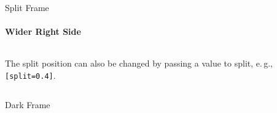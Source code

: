 \begin{frame}[split=0.4]{Split Frame}
  \framesubtitle{Wider Right Side}
  \begin{columns}[t]
    \begin{column}{0.38\textwidth}
      The split position can also be changed by passing a value to split, e.\,g.,
      \texttt{[split=0.4]}.
    \end{column}
    \hfill
    \begin{column}{0.58\textwidth}
      \color{cwhite}
      \inputminted{latex}{content/example_split_frame_var.tex}
    \end{column}
  \end{columns}
\end{frame}

\begin{frame}[full]{Dark Frame}

\end{frame}
